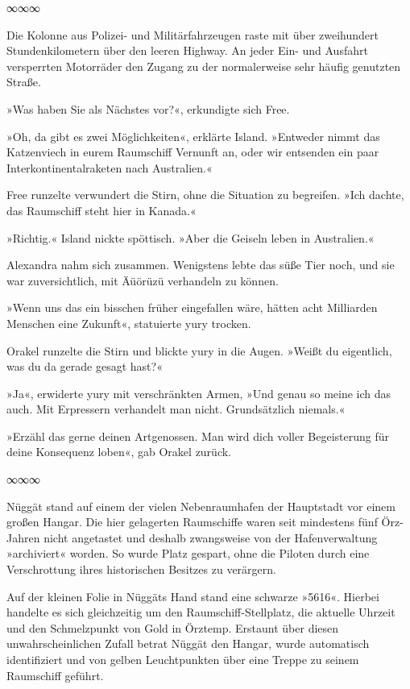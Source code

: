 \begin{center}
∞∞∞
\end{center}

Die Kolonne aus Polizei- und Militärfahrzeugen raste mit über zweihundert Stundenkilometern über den leeren Highway. An jeder Ein- und Ausfahrt versperrten Motorräder den Zugang zu der normalerweise sehr häufig genutzten Straße.

»Was haben Sie als Nächstes vor?«, erkundigte sich Free.

»Oh, da gibt es zwei Möglichkeiten«, erklärte Island. »Entweder nimmt das Katzenviech in eurem Raumschiff Vernunft an, oder wir entsenden ein paar Interkontinentalraketen nach Australien.«

Free runzelte verwundert die Stirn, ohne die Situation zu begreifen. »Ich dachte, das Raumschiff steht hier in Kanada.«

»Richtig.« Island nickte spöttisch. »Aber die Geiseln leben in Australien.«

Alexandra nahm sich zusammen. Wenigstens lebte das süße Tier noch, und sie war zuversichtlich, mit Äüörüzü verhandeln zu können.

»Wenn uns das ein bisschen früher eingefallen wäre, hätten acht Milliarden Menschen eine Zukunft«, statuierte yury trocken.

Orakel runzelte die Stirn und blickte yury in die Augen. »Weißt du eigentlich, was du da gerade gesagt hast?«

»Ja«, erwiderte yury mit verschränkten Armen, »Und genau so meine ich das auch. Mit Erpressern verhandelt man nicht. Grundsätzlich niemals.«

»Erzähl das gerne deinen Artgenossen. Man wird dich voller Begeisterung für deine Konsequenz loben«, gab Orakel zurück.

\begin{center}
∞∞∞
\end{center}

Nüggät stand auf einem der vielen Nebenraumhafen der Hauptstadt vor einem großen Hangar. Die hier gelagerten Raumschiffe waren seit mindestens fünf Örz-Jahren nicht angetastet und deshalb zwangsweise von der Hafenverwaltung »archiviert« worden. So wurde Platz gespart, ohne die Piloten durch eine Verschrottung ihres historischen Besitzes zu verärgern.

Auf der kleinen Folie in Nüggäts Hand stand eine schwarze »5616«. Hierbei handelte es sich gleichzeitig um den Raumschiff-Stellplatz, die aktuelle Uhrzeit und den Schmelzpunkt von Gold in Örztemp. Erstaunt über diesen unwahrscheinlichen Zufall betrat Nüggät den Hangar, wurde automatisch identifiziert und von gelben Leuchtpunkten über eine Treppe zu seinem Raumschiff geführt.

